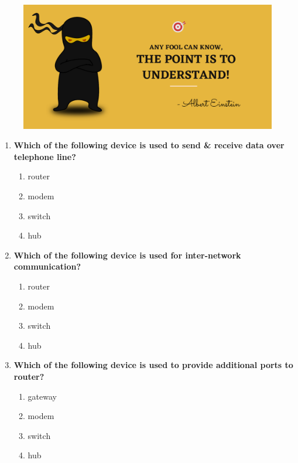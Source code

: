 \setlength{\columnsep}{3pt}
\begin{flushleft}
	
	\paragraph{}
	\bigskip
	
	\begin{figure}[h!]
		\centering
		\includegraphics[scale=.2]{content/practise.jpg}
	\end{figure}	
	\begin{enumerate}
		
		\item \textbf{Which of the following device is used to send \& receive data over telephone line?}
		\begin{enumerate}[label=(\alph*)]
			\item router
			\item modem %
			\item switch
			\item hub
		\end{enumerate}
		\bigskip
		\bigskip
		
		\item \textbf{Which of the following device is used for inter-network communication?}
		\begin{enumerate}[label=(\alph*)]
			\item router %
			\item modem 
			\item switch
			\item hub
		\end{enumerate}
		\bigskip
		\bigskip	
		
		\item \textbf{Which of the following device is used to provide additional ports to router?}
		\begin{enumerate}[label=(\alph*)]
			\item gateway
			\item modem 
			\item switch   %
			\item hub
		\end{enumerate}
		\bigskip
		\bigskip	


\end{enumerate}
\end{flushleft}
